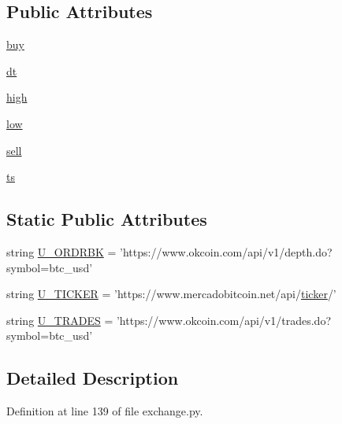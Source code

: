 \subsection*{Public Attributes}
\begin{DoxyCompactItemize}
\item 
\hyperlink{classexchange_1_1_mercado_bitcoin_ada27b62a35286b9f5dbb54590c5bacd2}{buy}
\item 
\hyperlink{classexchange_1_1_mercado_bitcoin_aeee983ba4f72223a11fb914d22902c56}{dt}
\item 
\hyperlink{classexchange_1_1_mercado_bitcoin_a0b9c2d465601a48e3b8838354e931c39}{high}
\item 
\hyperlink{classexchange_1_1_mercado_bitcoin_aaa3aae824bfc5ba3b7dc5252e9554713}{low}
\item 
\hyperlink{classexchange_1_1_mercado_bitcoin_a9982c7a3f6103c88c64160a5854c35cd}{sell}
\item 
\hyperlink{classexchange_1_1_mercado_bitcoin_ac4630b08e08f9eeb9dad838dc9dc0cda}{ts}
\end{DoxyCompactItemize}
\subsection*{Static Public Attributes}
\begin{DoxyCompactItemize}
\item 
string \hyperlink{classexchange_1_1_mercado_bitcoin_a7dd22c2c0261557a694678d8057d2547}{U\-\_\-\-O\-R\-D\-R\-B\-K} = 'https\-://www.\-okcoin.\-com/api/v1/depth.\-do?symbol=btc\-\_\-usd'
\item 
string \hyperlink{classexchange_1_1_mercado_bitcoin_a310b7df5ae9e8a46bad918428c67d4e8}{U\-\_\-\-T\-I\-C\-K\-E\-R} = 'https\-://www.\-mercadobitcoin.\-net/api/\hyperlink{classexchange_1_1_exchange_a7cf9e52f993627955a2e242c388daaeb}{ticker}/'
\item 
string \hyperlink{classexchange_1_1_mercado_bitcoin_a20ad6407ef07ab8a55d3c022d1512a5d}{U\-\_\-\-T\-R\-A\-D\-E\-S} = 'https\-://www.\-okcoin.\-com/api/v1/trades.\-do?symbol=btc\-\_\-usd'
\end{DoxyCompactItemize}


\subsection{Detailed Description}


Definition at line 139 of file exchange.\-py.



